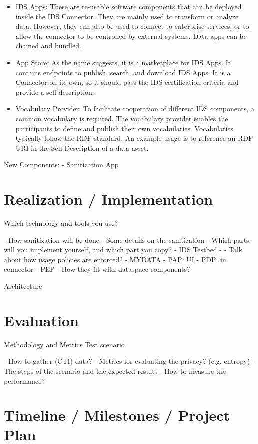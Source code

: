 \documentclass{article}
\begin{document}
\begin{itemize}
    \item IDS Apps: These are re-usable software components that can be deployed inside the IDS Connector. They are mainly used to transform or analyze data. However, they can also be used to connect to enterprise services, or to allow the connector to be controlled by external systems. Data apps can be chained and bundled.
    \item App Store: As the name suggests, it is a marketplace for IDS Apps. It contains endpoints to publish, search, and download IDS Apps. It is a Connector on its own, so it should pass the IDS certification criteria and provide a self-description.
    \item Vocabulary Provider: To facilitate cooperation of different IDS components, a common vocabulary is required. The vocabulary provider enables the participants to define and publish their own vocabularies. Vocabularies typically follow the RDF standard. An example usage is to reference an RDF URI in the Self-Description of a data asset.
\end{itemize}

New Components:
- Sanitization App

\section{Realization / Implementation} %
Which technology and tools you use?

- How sanitization will be done
    - Some details on the sanitization 
- Which parts will you implement yourself, and which part you copy?
    - IDS Testbed
    - 
- Talk about how usage policies are enforced?
    - MYDATA
        - PAP: UI
        - PDP: in connector
        - PEP
- How they fit with dataspace components?

Architecture

\section{Evaluation} %
Methodology and Metrics
Test scenario

- How to gather (CTI) data?
- Metrics for evaluating the privacy? (e.g. entropy)
- The steps of the scenario and the expected results
- How to measure the performance?


\section{Timeline / Milestones / Project Plan} %

 

\end{document}
